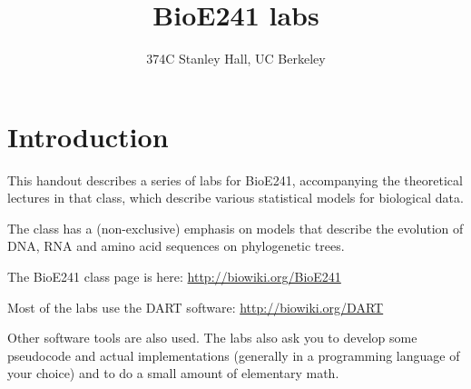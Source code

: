 \documentclass[10pt]{article}
\begin{document}
\title{BioE241 labs}
\author{374C Stanley Hall, UC Berkeley}
\date{}

\maketitle

\titlecite

\newpage
\tableofcontents

\newpage
\section*{Introduction}

This handout describes a series of labs for BioE241,
accompanying the theoretical lectures in that class,
which describe various statistical models for biological data.

The class has a (non-exclusive) emphasis on models that describe the evolution of
DNA, RNA and amino acid sequences on phylogenetic trees.

The BioE241 class page is here: \url{http://biowiki.org/BioE241}

Most of the labs use the DART software: \url{http://biowiki.org/DART}

Other software tools are also used.
The labs also ask you to develop some pseudocode and actual implementations
(generally in a programming language of your choice)
and to do a small amount of elementary math.
















\newpage

\end{document}
